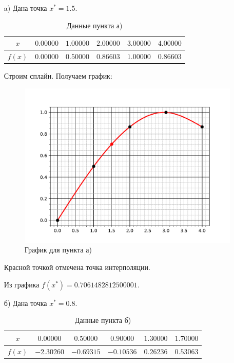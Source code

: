 		
		
		\begin{enumerate}
			\item[a)] Дана точка $x^* = 1.5$.
			\begin{table}[h!]
				\centering
					\begin{tabular}{|c|c|c|c|c|c|}
						\hline
						$x$    & $0.00000$ & $1.00000$ & $2.00000$ & $3.00000$ & $4.00000$ \\ \hline
						$f(x)$ & $0.00000$ & $0.50000$ & $0.86603$ & $1.00000$ & $0.86603$ \\ \hline
					\end{tabular}
				\caption{Данные пункта а)}
			\end{table}
			
			Строим сплайн. Получаем график:
			\begin{figure}[h!]
				\centering
				\includegraphics[width=\linewidth]{Pictures/1}
				\caption{График для пункта а)}
			\end{figure}
		
			Красной точкой отмечена точка интерполяции. 
			
			Из графика $f(x^*) = 0.7061482812500001$.
			
			
			\newpage
			
			\item[б)] Дана точка $x^* = 0.8$.
			\begin{table}[h!]
				\centering
				\begin{tabular}{|c|c|c|c|c|c|}
					\hline
					$x$    & $0.00000$ & $0.50000$ & $0.90000$ & $1.30000$ & $1.70000$ \\ \hline
					$f(x)$ & $-2.30260$ & $-0.69315$ & $-0.10536$ & $0.26236$ & $0.53063$ \\ \hline
				\end{tabular}
				\caption{Данные пункта б)}
			\end{table}
			

\end{enumerate}
